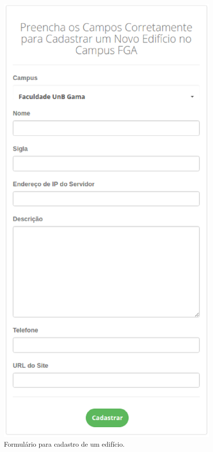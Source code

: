 \begin{apendicesenv}
\begin{figure}[!htpb]
    \centering
    \includegraphics[keepaspectratio=true,scale=0.65]{figuras/img10.eps}
    \caption{Formulário para cadastro de um edifício.}
    \label{img10}
\end{figure}


\end{apendicesenv}
